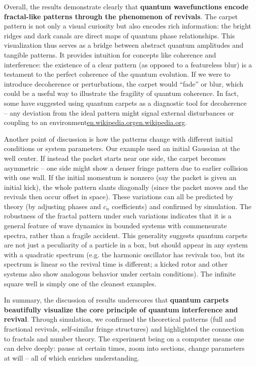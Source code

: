 \documentclass[11pt,a4paper]{article}
\begin{document}
Overall, the results demonstrate clearly that \textbf{quantum wavefunctions encode fractal-like patterns through the phenomenon of revivals}. The carpet pattern is not only a visual curiosity but also encodes rich information: the bright ridges and dark canals are direct maps of quantum phase relationships. This visualization thus serves as a bridge between abstract quantum amplitudes and tangible patterns. It provides intuition for concepts like coherence and interference: the existence of a clear pattern (as opposed to a featureless blur) is a testament to the perfect coherence of the quantum evolution. If we were to introduce decoherence or perturbations, the carpet would “fade” or blur, which could be a useful way to illustrate the fragility of quantum coherence. In fact, some have suggested using quantum carpets as a diagnostic tool for decoherence – any deviation from the ideal pattern might signal external disturbances or coupling to an environment\href{https://en.wikipedia.org/wiki/Quantum_carpet#:~:text=a quantum carpet is mainly,by the quantum fractional revivals}{en.wikipedia.org}\href{https://en.wikipedia.org/wiki/Quantum_carpet#:~:text=Quantum carpets demonstrate many principles,certain aspects of  55}{en.wikipedia.org}.

Another point of discussion is how the patterns change with different initial conditions or system parameters. Our example used an initial Gaussian at the well center. If instead the packet starts near one side, the carpet becomes asymmetric – one side might show a denser fringe pattern due to earlier collision with one wall. If the initial momentum is nonzero (say the packet is given an initial kick), the whole pattern slants diagonally (since the packet moves and the revivals then occur offset in space). These variations can all be predicted by theory (by adjusting phases and $c_n$ coefficients) and confirmed by simulation. The robustness of the fractal pattern under such variations indicates that it is a general feature of wave dynamics in bounded systems with commensurate spectra, rather than a fragile accident. This generality suggests quantum carpets are not just a peculiarity of a particle in a box, but should appear in any system with a quadratic spectrum (e.g. the harmonic oscillator has revivals too, but its spectrum is linear so the revival time is different; a kicked rotor and other systems also show analogous behavior under certain conditions). The infinite square well is simply one of the cleanest examples.

In summary, the discussion of results underscores that \textbf{quantum carpets beautifully visualize the core principle of quantum interference and revival}. Through simulation, we confirmed the theoretical patterns (full and fractional revivals, self-similar fringe structures) and highlighted the connection to fractals and number theory. The experiment being on a computer means one can delve deeply: pause at certain times, zoom into sections, change parameters at will – all of which enriches understanding.
\end{document}
